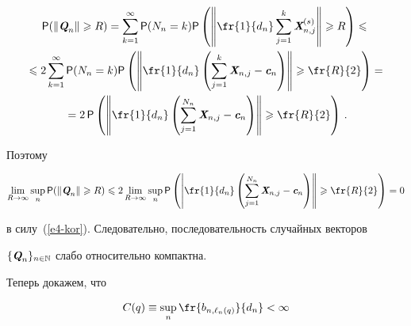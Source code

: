 \noindent


\begin{multline*}


{\sf P}(\|\vQ_n\|\geqslant R)=\sum\limits_{k=1}^{\infty}{\sf


P}(N_n=k){\sf


P}\left(\left\|\fr{1}{d_n}\sum\limits_{j=1}^k\vX_{n,j}^{(s)}\right\|\geqslant


R\right)\leqslant{}


\\


{}\leqslant 2\sum\limits_{k=1}^{\infty}{\sf P}(N_n=k){\sf


P}\left(\left\|\fr{1}{d_n}\left(\sum\limits_{j=1}^k\vX_{n,j}-\vc_n\right)\right\|\geqslant


\fr{R}{2}\right)={}\\


{}=2\,{\sf


P}\left(\left\|\fr{1}{d_n}\left(\sum\limits_{j=1}^{N_n}\vX_{n,j}-\vc_n


\right)\right\|\geqslant


\fr{R}{2}\right)\,.


\end{multline*}


Поэтому


$$


\lim\limits_{R\to\infty}\sup\limits_n{\sf P}(\|\vQ_n\|\geqslant R)\leqslant


2\lim\limits_{R\to\infty}\sup\limits_n{\sf


P}\left(\left|\fr{1}{d_n}\left(\sum\limits_{j=1}^{N_n}\vX_{n,j}-\vc_n


\right)\right\|\geqslant


\fr{R}{2}\right)=0


$$


в силу~(\ref{e4-kor}). Следовательно, последовательность случайных векторов


$\{\emph{\textbf{Q}}_n\}_{n\in\mathbb{N}}$ слабо относительно компактна.





Теперь докажем, что


\begin{equation}


C(q)\equiv\sup\limits_n\fr{b_{n,\ell_n(q)}}{d_n}<\infty


\label{e7-kor}


\end{equation}


